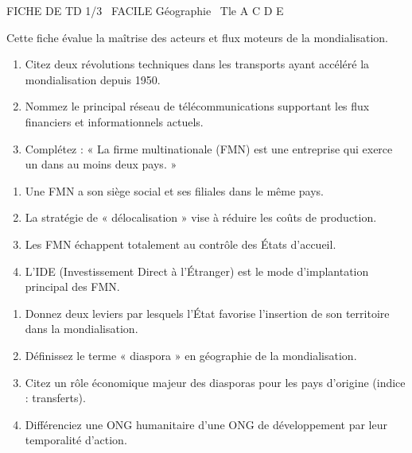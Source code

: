 \documentclass[11pt]{article}
\begin{document}
\begin{tcolorbox}[enhanced,colback=popink,colframe=popink,arc=10pt,boxrule=0pt,left=12pt,right=12pt,top=9pt,bottom=9pt]
{\color{white}\popxbold\small FICHE DE TD 1/3 \textbullet\ FACILE \hfill Géographie \textbullet\ Tle A C D E\par}
\end{tcolorbox}
\vspace{4pt}
Cette fiche évalue la maîtrise des acteurs et flux moteurs de la mondialisation.

\begin{exercice}
\begin{enumerate}
    \item Citez deux révolutions techniques dans les transports ayant accéléré la mondialisation depuis 1950.
    \item Nommez le principal réseau de télécommunications supportant les flux financiers et informationnels actuels.
    \item Complétez : « La firme multinationale (FMN) est une entreprise qui exerce un \underline{\hspace{3cm}} dans au moins deux pays. »
\end{enumerate}
\end{exercice}

\begin{exercice}
\begin{enumerate}
    \item Une FMN a son siège social et ses filiales dans le même pays.
    \item La stratégie de « délocalisation » vise à réduire les coûts de production.
    \item Les FMN échappent totalement au contrôle des États d'accueil.
    \item L'IDE (Investissement Direct à l'Étranger) est le mode d'implantation principal des FMN.
\end{enumerate}
\end{exercice}

\begin{exercice}
\begin{enumerate}
    \item Donnez deux leviers par lesquels l'État favorise l'insertion de son territoire dans la mondialisation.
    \item Définissez le terme « diaspora » en géographie de la mondialisation.
    \item Citez un rôle économique majeur des diasporas pour les pays d'origine (indice : transferts).
    \item Différenciez une ONG humanitaire d'une ONG de développement par leur temporalité d'action.
\end{enumerate}
\end{exercice}
\end{document}
